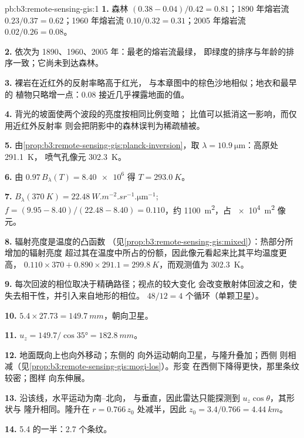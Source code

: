 \begin{solution}{pb:b3:remote-sensing-gis:1}
\textbf{1.} 森林 $(0.38 - 0.04)/0.42 = 0.81$；1890 年熔岩流 $0.23/0.37 =
0.62$；1960 年熔岩流 $0.10/0.32 = 0.31$；2005 年熔岩流 $0.02/0.26 = 0.08$。

\textbf{2.} 依次为 1890、1960、2005 年：最老的熔岩流最绿，
即绿度的排序与年龄的排序一致；它尚未到达森林。

\textbf{3.} 裸岩在近红外的反射率略高于红光，
与本章图中的棕色沙地相似；地衣和最早的
植物只略增一点：0.08 接近几乎裸露地面的值。

\textbf{4.} 背光的坡面使两个波段的亮度按相同比例变暗；
比值可以抵消这一影响，而仅用近红外反射率
则会把阴影中的森林误判为稀疏植被。

\textbf{5.} 由\cref{prop:b3:remote-sensing-gis:planck-inversion}，取 
$\lambda = \qty{10.9}{\micro\metre}$：高原处 \qty{291.1}{K}，
喷气孔像元 \qty{302.3}{K}。

\textbf{6.} 由 $0.97\,B_\lambda(T) = \num{8.40e6}$ 得 $T = \qty{293.0}{K}$。

\textbf{7.} $B_\lambda(\qty{370}{K}) =
\qty{22.48}{W.m^{-2}.sr^{-1}.\micro\metre^{-1}}$; $f = (9.95 - 8.40)/(22.48
- 8.40) = 0.110$，约 \qty{1100}{m^2}，占 \qty{e4}{m^2} 像元。

\textbf{8.} 辐射亮度是温度的凸函数
（见\cref{prop:b3:remote-sensing-gis:mixed}）：热部分所增加的辐射亮度
超过其在温度中所占的份额，因此像元看起来比其平均温度更高，
$0.110\times370 + 0.890\times291.1 = \qty{299.8}{K}$，而观测值为
\qty{302.3}{K}。

\textbf{9.} 每次回波的相位取决于精确路径；视点的较大变化
会改变散射体回波之和，使
失去相干性，并引入来自地形的相位。
$48/12 = 4$ 个循环（单颗卫星）。

\textbf{10.} $5.4\times27.73 = \qty{149.7}{mm}$，朝向卫星。

\textbf{11.} $u_z = 149.7/\cos\ang{35} = \qty{182.8}{mm}$。

\textbf{12.} 地面既向上也向外移动；东侧的
向外运动朝向卫星，与隆升叠加；西侧
则相减（见\cref{prop:b3:remote-sensing-gis:mogi-los}）。形变
在西侧下降得更快，那里条纹较密；图样
向东伸展。

\textbf{13.} 沿该线，水平运动为南–北向，
与垂直，因此雷达只能探测到 $u_z\cos\theta$，其形状与
隆升相同。隆升在 $r = 0.766\,z_0$ 处减半，因此 $z_0 =
3.4/0.766 = \qty{4.44}{km}$。

\textbf{14.} 5.4 的一半：2.7 个条纹。


\end{solution}

